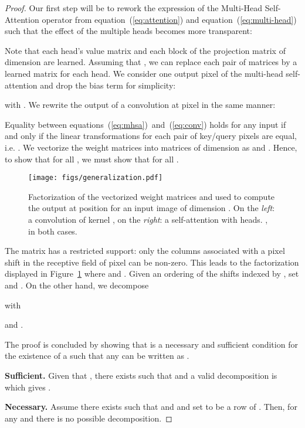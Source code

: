 \documentclass{article} \usepackage{iclr2020_conference,times}
\def\eqref#1{equation~(\ref{#1})}
\begin{document}
\begin{proof}
Our first step will be to rework the expression of the Multi-Head Self-Attention operator from  \eqref{eq:attention} and \eqref{eq:multi-head} such that the effect of the multiple heads becomes more transparent:

Note that each head's value matrix  and each block of the projection matrix  of dimension  are learned.
Assuming that , we can replace each pair of matrices by a learned matrix  for each head.
We consider one output pixel of the multi-head self-attention and drop the bias term for simplicity:

with .
We rewrite the output of a convolution at pixel  in the same manner:

Equality between equations~(\ref{eq:mhsa})~and~(\ref{eq:conv}) holds for any input  if and only if the linear transformations for each pair of key/query pixels are equal, i.e. .
We vectorize the weight matrices into matrices of dimension  as  and .
Hence, to show that  for all , we must show that  for all .

\begin{figure}
  \centering
  \texttt{[image: figs/generalization.pdf]}
  \caption{Factorization of the vectorized weight matrices  and  used to compute the output at position  for an input image of dimension . On the \emph{left}: a convolution of kernel , on the \emph{right}: a self-attention with  heads. ,  in both cases.}
  \label{fig:generalization}
\end{figure}


The matrix  has a restricted support: only the columns associated with a pixel shift  in the receptive field of pixel  can be non-zero.
This leads to the factorization  displayed in Figure~\ref{fig:generalization} where  and . Given an ordering of the shifts  indexed by , set  and .
On the other hand, we decompose

  with
   
   and
    .


The proof is concluded by showing that  is a necessary and sufficient condition
for the existence of a  such that any  can be written as .

\textbf{Sufficient.}
Given that , there exists  such that  and a valid decomposition is  which gives .

\textbf{Necessary.}
Assume there exists  such that  and 
and set  to be a row of .
Then,  for any  and there is no possible decomposition.


\end{proof}
\end{document}
